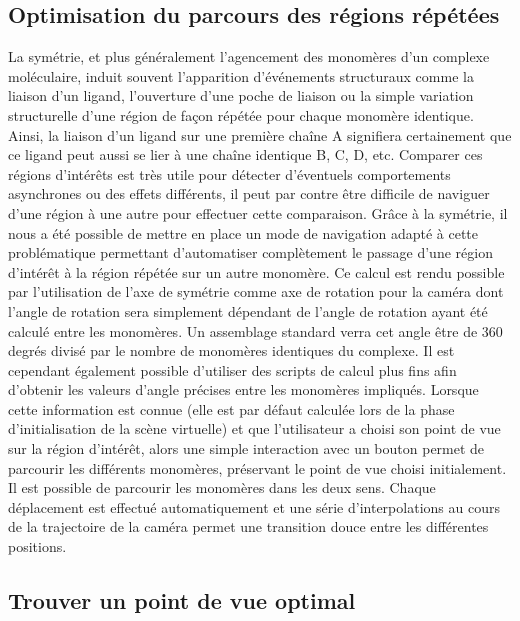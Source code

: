 \subsection{Optimisation du parcours des régions répétées}

La symétrie, et plus généralement l'agencement des monomères d'un complexe moléculaire, induit souvent l'apparition d'événements structuraux comme la liaison d'un ligand, l'ouverture d'une poche de liaison ou la simple variation structurelle d'une région de façon répétée pour chaque monomère identique. Ainsi, la liaison d'un ligand sur une première chaîne A signifiera certainement que ce ligand peut aussi se lier à une chaîne identique B, C, D, etc. Comparer ces régions d'intérêts est très utile pour détecter d'éventuels comportements asynchrones ou des effets différents, il peut par contre être difficile de naviguer d'une région à une autre pour effectuer cette comparaison. Grâce à la symétrie, il nous a été possible de mettre en place un mode de navigation adapté à cette problématique permettant d'automatiser complètement le passage d'une région d'intérêt à la région répétée sur un autre monomère. Ce calcul est rendu possible par l'utilisation de l'axe de symétrie comme axe de rotation pour la caméra dont l'angle de rotation sera simplement dépendant de l'angle de rotation ayant été calculé entre les monomères. Un assemblage standard verra cet angle être de 360 degrés divisé par le nombre de monomères identiques du complexe. Il est cependant également possible d'utiliser des scripts de calcul plus fins afin d'obtenir les valeurs d'angle précises entre les monomères impliqués. Lorsque cette information est connue (elle est par défaut calculée lors de la phase d'initialisation de la scène virtuelle) et que l'utilisateur a choisi son point de vue sur la région d'intérêt, alors une simple interaction avec un bouton permet de parcourir les différents monomères, préservant le point de vue choisi initialement. Il est possible de parcourir les monomères dans les deux sens. Chaque déplacement est effectué automatiquement et une série d'interpolations au cours de la trajectoire de la caméra permet une transition douce entre les différentes positions.

\subsection{Trouver un point de vue optimal}

